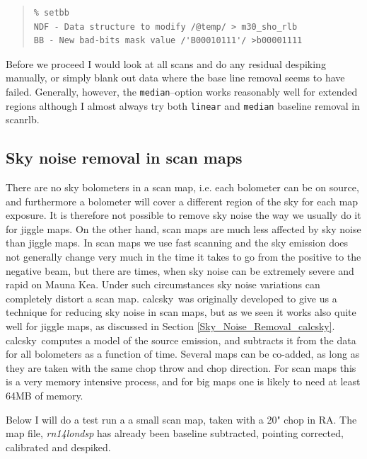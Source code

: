 \documentclass[twoside,11pt]{article}
\newenvironment{myquote}{\begin{quote}\begin{small}}{\end{small}\end{quote}}
\newcommand{\task}[1]{\textsf{#1}}
\newcommand{\calcsky}{\xref{\task{calcsky}}{sun216}{CALCSKY}}
\newcommand{\scanrlb}{\xref{\task{scan\_rlb}}{sun216}{SCAN_RLB}}
\newcommand{\xref}[3]{#1}
\newcommand{\xlabel}[1]{}
\renewcommand{\_}{\texttt{\symbol{95}}}
\begin{document}
\begin{myquote}
\begin{verbatim}
% setbb
NDF - Data structure to modify /@temp/ > m30_sho_rlb
BB - New bad-bits mask value /'B00010111'/ >b00001111
\end{verbatim}
\end{myquote}

Before we proceed I would look at all scans and do any residual
despiking manually, or simply blank out data where the base line
removal seems to have failed. Generally, however, the
\texttt{median}--option works reasonably well for extended regions
although I almost always try both \texttt{linear} and \texttt{median}
baseline removal in \scanrlb.

\subsection{\xlabel{scan_maps_calcsky}Sky noise removal in scan maps \label{scan_maps_calcsky}}

There are no sky bolometers in a scan map, i.e. each bolometer can be
on source, and furthermore a bolometer will cover a different region of
the sky for each map exposure. It is therefore not possible to remove
sky noise the way we usually do it for jiggle maps. On the other hand,
scan maps are much less affected by sky noise than jiggle maps. In scan
maps we use fast scanning and the sky emission does not generally
change very much in the time it takes to go from the positive to the
negative beam, but there are times, when sky noise can be extremely
severe and rapid on Mauna Kea. Under such circumstances sky noise
variations can completely distort a scan map. \calcsky\ was originally
developed to give us a technique for reducing sky noise in scan maps,
but as we seen it works also quite well for jiggle maps, as discussed
in Section \ref{Sky_Noise_Removal_calcsky}. \calcsky\ computes a model
of the source emission, and subtracts it from the data for all
bolometers as a function of time. Several maps can be co-added, as long
as they are taken with the same chop throw and chop direction.  For
scan maps this is a very memory intensive process, and for big maps one
is likely to need at least 64MB of memory.

Below I will do a test run a a small scan map, taken with a 20" chop in RA.
The map file, {\it rn14\_lon\_dsp} has already been baseline subtracted, pointing corrected, calibrated and despiked.
\end{document}
